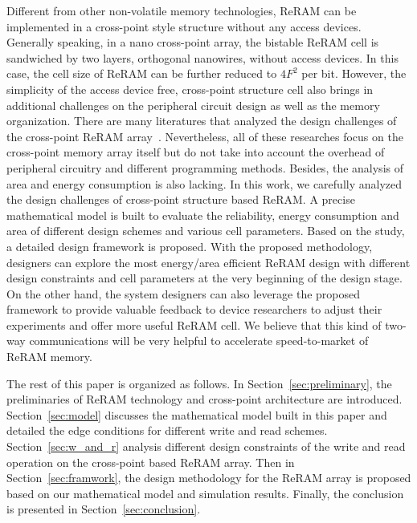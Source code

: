Different from other non-volatile memory technologies, ReRAM can be implemented in a cross-point style structure without any access devices. Generally speaking, in a nano cross-point array, the bistable ReRAM cell is sandwiched by two layers, orthogonal nanowires, without access devices. In this case, the cell size of ReRAM can be further reduced to $4F^2$ per bit. However, the simplicity of the access device free, cross-point structure cell also brings in additional challenges on the peripheral circuit design as well as the memory organization. There are many literatures that analyzed the design challenges of the cross-point ReRAM array~\cite{crossbar_NANO08_Flocke}\cite{crossbar_NANO2002_Ziegler}\cite{crossbar_NANO2003_Ziegler}\cite{crossbar_TED_2010}. Nevertheless, all of these researches focus on the cross-point memory array itself but do not take into account the overhead of peripheral circuitry and different programming methods. Besides, the analysis of area and energy consumption is also lacking. In this work, we carefully analyzed the design challenges of cross-point structure based ReRAM. A precise mathematical model is built to evaluate the reliability, energy consumption and area of different design schemes and various cell parameters. Based on the study, a detailed design framework is proposed. With the proposed methodology, designers can explore the most energy/area efficient ReRAM design with different design constraints and cell parameters at the very beginning of the design stage. On the other hand, the system designers can also leverage the proposed framework to provide valuable feedback to device researchers to adjust their experiments and offer more useful ReRAM cell. We believe that this kind of two-way communications will be very helpful to accelerate speed-to-market of ReRAM memory.

The rest of this paper is organized as follows. In
Section~\ref{sec:preliminary}, the preliminaries of ReRAM technology and cross-point architecture are introduced. Section~\ref{sec:model} discusses the mathematical model built in this paper and detailed the edge conditions for different write and read schemes. Section~\ref{sec:w_and_r} analysis different design constraints of the write and read operation on the cross-point based ReRAM array. Then in Section~\ref{sec:framwork}, the design methodology for the ReRAM array is proposed based on our mathematical model and simulation results. Finally, the conclusion is presented in Section~\ref{sec:conclusion}.